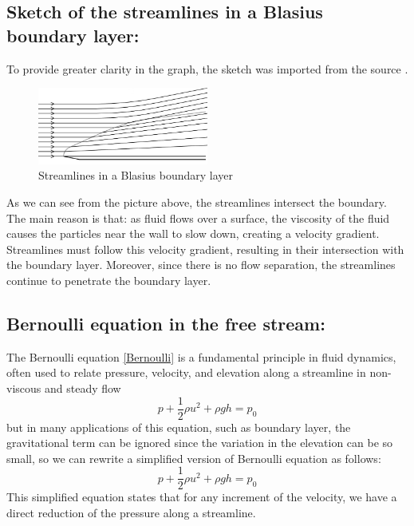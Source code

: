 \documentclass{article}
\begin{document}
\subsection{Sketch of the streamlines in a Blasius boundary layer:}
To provide greater clarity in the graph, the sketch was imported from the source \cite{Streamlines}.
\begin{figure}[h!]
    \centering
    \includegraphics[width=0.5\textwidth]{streamlines_blasius.png}
    \caption{Streamlines in a Blasius boundary layer}
    \label{fig: streamlines}
\end{figure}

As we can see from the picture above, the streamlines intersect the boundary. The main reason is that: as fluid flows over a surface, the viscosity of the fluid causes the particles near the wall to slow down, creating a velocity gradient. Streamlines must follow this velocity gradient, resulting in their intersection with the boundary layer. Moreover, since there is no flow separation, the streamlines continue to penetrate the boundary layer.



\subsection{Bernoulli equation in the free stream:}

The Bernoulli equation \eqref{Bernoulli} is a fundamental principle in fluid dynamics, often used to relate pressure, velocity, and elevation along a streamline in non-viscous and steady flow
\begin{equation} \label{Bernoulli}
    p + \frac{1}{2}\rho u^2 + \rho g h = p_0
\end{equation}
but in many applications of this equation, such as boundary layer, the gravitational term can be ignored since the variation in the elevation can be so small, so we can rewrite a simplified version of Bernoulli equation as follows:
\begin{equation}
    p + \frac{1}{2}\rho u^2 + \rho g h = p_0 
\end{equation}
This simplified equation states that for any increment of the velocity, we have a direct reduction of the pressure along a streamline. 
\end{document}
